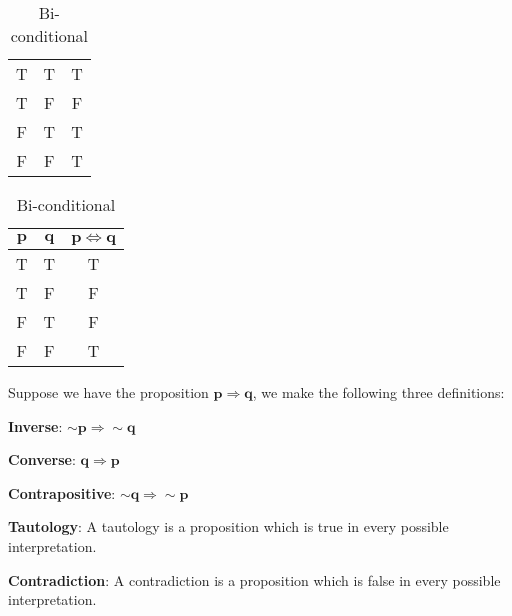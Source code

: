 \begin{defn}
\begin{table}[!htb]
\begin{minipage}{0.38\textwidth}
\begin{tabular}{|c|c|c|}
         \hline
         T & T & T\\
         T & F & F\\
         F & T & T\\
         F & F & T\\
         \hline
      \end{tabular}
      \caption{\label{mod1:tab:Conditional}Conditional}
   \end{minipage}
   \begin{minipage}{0.38\textwidth}
      \centering
      \begin{tabular}{|c|c|c|}
         \hline
         $\boldsymbol{p}$ & $\boldsymbol{q}$ & $\boldsymbol{p \Leftrightarrow q}$\\
         \hline
         T & T & T\\
         T & F & F\\
         F & T & F\\
         F & F & T\\
         \hline
      \end{tabular}
      \caption{\label{mod1:tab:Bi-conditional}Bi-conditional}
   \end{minipage}
\end{table}
\end{defn}


\noindent Suppose we have the proposition $\boldsymbol{p \Rightarrow q}$, we make the following three definitions:
\begin{defn}\label{mod1:defn:Inverse}
   \textbf{Inverse}: $\boldsymbol{\sim p \Rightarrow \sim q}$ 
\end{defn}

\begin{defn}\label{mod1:defn:Converse}
   \textbf{Converse}: $\boldsymbol{q \Rightarrow p}$ 
\end{defn}

\begin{defn}\label{mod1:defn:Contrapositive}
   \textbf{Contrapositive}: $\boldsymbol{\sim q \Rightarrow \sim p}$ 
\end{defn}

\begin{defn}\label{mod1:defn:Tautology}
   \textbf{Tautology}: A tautology is a proposition which is true in every possible interpretation.
\end{defn}

\begin{defn}\label{mod1:defn:Contradiction}
   \textbf{Contradiction}: A contradiction is a proposition which is false in every possible interpretation.
\end{defn}





